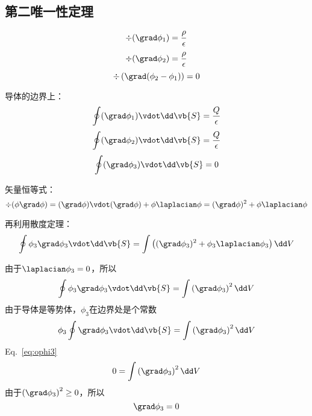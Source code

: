 \subsection{第二唯一性定理}%

\begin{equation*}
	\div(\grad \phi_1 )= \frac{\rho}{\epsilon}
\end{equation*}
\begin{equation*}
	\div(\grad \phi_2 )= \frac{\rho}{\epsilon}
\end{equation*}
\begin{equation*}
	\div\left(\grad (\phi_2 - \phi_1) \right)=0
\end{equation*}

导体的边界上：
\begin{equation*}
	\oint (\grad \phi_1 ) \vdot \dd \vb{S}= \frac{Q}{\epsilon}
\end{equation*}
\begin{equation*}
	\oint (\grad \phi_2 ) \vdot \dd \vb{S}= \frac{Q}{\epsilon}
\end{equation*}
\begin{equation}
	\oint (\grad \phi_3 ) \vdot \dd \vb{S}=0
	\label{eq:ophi3}
\end{equation}

矢量恒等式：
\begin{equation*}
	\div(\phi \grad \phi) 
	= 
	(\grad \phi) \vdot (\grad \phi) 
	+
	\phi \laplacian \phi
	= 
	(\grad \phi)^2
	+
	\phi \laplacian \phi
\end{equation*}

再利用散度定理：
\begin{equation*}
	\oint \phi_3 \grad \phi_3 \vdot \dd \vb{S} 
	= 
	\int
	\left( 
	(\grad \phi_3)^2
	+
	\phi_3 \laplacian \phi_3\right)
	\dd V
\end{equation*}

由于\(\laplacian \phi_3=0\)，所以
\begin{equation*}
	\oint \phi_3 \grad \phi_3 \vdot \dd \vb{S} 
	= 
	\int
	\left(\grad \phi_3\right)^2
	\dd V
\end{equation*}
由于导体是等势体，\(\phi_3\)在边界处是个常数
\begin{equation*}
\phi_3 	\oint \grad \phi_3 \vdot \dd \vb{S} 
	= 
	\int
	\left(\grad \phi_3\right)^2
	\dd V
\end{equation*}
Eq.~\eqref{eq:ophi3} 
\begin{equation*}
	0
	= 
	\int
	\left(\grad \phi_3\right)^2
	\dd V
\end{equation*}
由于\(	\left(\grad \phi_3\right)^2 \geq 0\)，所以
\begin{equation*}
	\grad \phi_3 = 0
\end{equation*}





